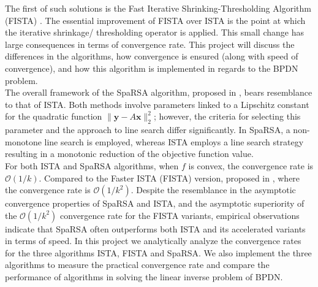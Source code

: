 \documentclass[a4paper]{article}
\begin{document}
The first of such solutions is the Fast Iterative Shrinking-Thresholding Algorithm (FISTA) \cite{beck2009fast}. The essential improvement of FISTA over ISTA is the point at which the iterative shrinkage/ thresholding operator is applied. This small change has large consequences in terms of convergence rate. This project will discuss the differences in the algorithms, how convergence is ensured (along with speed of convergence), and how this algorithm is implemented in regards to the BPDN problem. \\ 

The overall framework of the SpaRSA algorithm, proposed in \cite{wright2009sparse}, bears resemblance to that of ISTA. Both methods involve parameters linked to a Lipschitz constant for the quadratic function $\|\mathbf{y}-A\mathbf{x}\|_2^2$; however, the criteria for selecting this parameter and the approach to line search differ significantly. In SpaRSA, a non-monotone line search is employed, whereas ISTA employs a line search strategy resulting in a monotonic reduction of the objective function value. \\

For both ISTA and SpaRSA algorithms, when $f$ is convex, the convergence rate is $\mathcal{O}(1/k)$. Compared to the Faster ISTA (FISTA) version, proposed in \cite{beck2009fast}, where the convergence rate is $\mathcal{O}(1/k^2)$. Despite the resemblance in the asymptotic convergence properties of SpaRSA and ISTA, and the asymptotic superiority of the $\mathcal{O}(1/k^2)$ convergence rate for the FISTA variants, empirical observations indicate that SpaRSA often outperforms both ISTA and its accelerated variants in terms of speed. In this project we analytically analyze the convergence rates for the three algorithms ISTA, FISTA and SpaRSA. We also implement the three algorithms to measure the practical convergence rate and compare the performance of algorithms in solving the linear inverse problem of BPDN.




\end{document}
